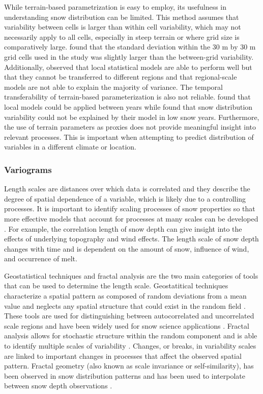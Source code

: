 \documentclass{sfuthesis}
\begin{document}
While terrain-based parametrization is easy to employ, its usefulness in understanding snow distribution can be limited. This method assumes that variability between cells is larger than within cell variability, which may not necessarily apply to all cells, especially in steep terrain or where grid size is comparatively large. \cite{Marchand2005} found that the standard deviation within the 30 m by 30 m grid cells used in the study was slightly larger than the between-grid variability. Additionally, \cite{Grunewald2013} observed that local statistical models are able to perform well but that they cannot be transferred to different regions and that regional-scale models are not able to explain the majority of variance. The temporal transferability of terrain-based parameterization is also not reliable. \cite{Grunewald2013} found that local models could be applied between years while \cite{Revuelto2014} found that snow distribution variability could not be explained by their model in low snow years. Furthermore, the use of terrain parameters as proxies does not provide meaningful insight into relevant processes. This is important when attempting to predict distribution of variables in a different climate or location. 

\subsubsection{Variograms}
\label{sec:variogram_intro}
Length scales are distances over which data is correlated and they describe the degree of spatial dependence of a variable, which is likely due to a controlling processes. It is important to identify scaling processes of snow properties so that more effective models that account for processes at many scales can be developed \citep{Bloeschl1999, Deems2006a}. For example, the correlation length of snow depth can give insight into the effects of underlying topography and wind effects. The length scale of snow depth changes with time and is dependent on the amount of snow, influence of wind, and occurrence of melt. 

Geostatistical techniques and fractal analysis are the two main categories of tools that can be used to determine the length scale. Geostatitical techniques characterize a spatial pattern as composed of random deviations from a mean value and neglects any spatial structure that could exist in the random field \citep{Deems2006a}. These tools are used for distinguishing between autocorrelated and uncorrelated scale regions and have been widely used for snow science applications \citep[e.g][]{Bloeschl1999, Deems2006, Marshall2006}. Fractal analysis allows for stochastic structure within the random component and is able to identify multiple scales of variability \citep{Deems2006a}. Changes, or breaks, in variability scales are linked to important changes in processes that affect the observed spatial pattern. Fractal geometry (also known as scale invariance or self-similarity), has been observed in snow distribution patterns \citep{Shook1996, Granger2002, Deems2006a,Trujillo2007, Deems2008} and has been used to interpolate between snow depth observations \citep{Shook1997}.
\end{document}
